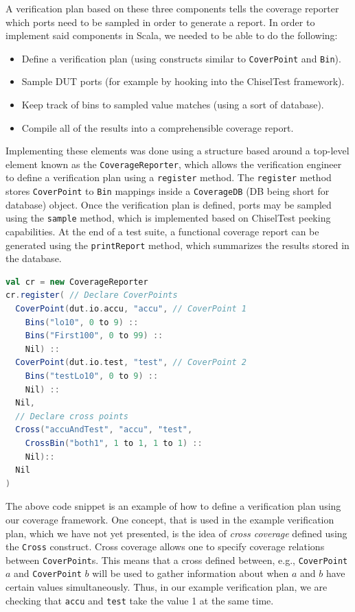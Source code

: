 \documentclass[conference]{IEEEtran}
\begin{document}
A verification plan based on these three components tells the coverage reporter which ports need to be sampled in order to generate a report. In order to implement said components in Scala, we needed to be able to do the following:

\begin{itemize}
  \item Define a verification plan (using constructs similar to \texttt{CoverPoint} and \texttt{Bin}).
  \item Sample DUT ports (for example by hooking into the ChiselTest framework).
  \item Keep track of bins to sampled value matches (using a sort of database).
  \item Compile all of the results into a comprehensible coverage report.
\end{itemize}

Implementing these elements was done using a structure based around a top-level element known as the \texttt{CoverageReporter}, which allows the verification engineer to define a verification plan using a \texttt{register} method. The \texttt{register} method stores \texttt{CoverPoint} to \texttt{Bin} mappings inside a \texttt{CoverageDB} (DB being short for database) object. Once the verification plan is defined, ports may be sampled using the \texttt{sample} method, which is implemented based on ChiselTest peeking capabilities. At the end of a test suite, a functional coverage report can be generated using the \texttt{printReport} method, which summarizes the results stored in the database.

\begin{lstlisting}[language=scala]
val cr = new CoverageReporter
cr.register( // Declare CoverPoints
  CoverPoint(dut.io.accu, "accu", // CoverPoint 1
    Bins("lo10", 0 to 9) ::
    Bins("First100", 0 to 99) ::
    Nil) ::
  CoverPoint(dut.io.test, "test", // CoverPoint 2
    Bins("testLo10", 0 to 9) ::
    Nil) ::
  Nil,
  // Declare cross points
  Cross("accuAndTest", "accu", "test", 
    CrossBin("both1", 1 to 1, 1 to 1) ::
    Nil)::
  Nil
)
\end{lstlisting}

The above code snippet is an example of how to define a verification plan using our coverage framework. One concept, that is used in the example verification plan, which we have not yet presented, is the idea of \textit{cross coverage} defined using the \texttt{Cross} construct. Cross coverage allows one to specify coverage relations between \texttt{CoverPoint}s. This means that a cross defined between, e.g., \texttt{CoverPoint} $a$ and \texttt{CoverPoint} $b$ will be used to gather information about when $a$ and $b$ have certain values simultaneously. Thus, in our example verification plan, we are checking that \texttt{accu} and \texttt{test} take the value 1 at the same time.
\end{document}
